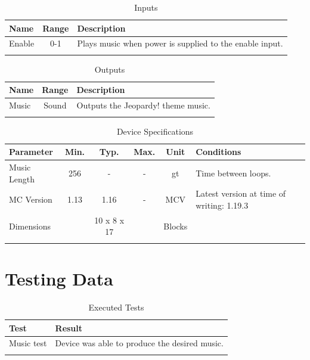 \documentclass[10pt]{datasheet}
\begin{document}
\begin{table}[h]
    \caption{Inputs}
    \begin{tabularx}{\textwidth}{l | c | X}
        \thickhline
        \textbf{Name} & \textbf{Range} & \textbf{Description} \\
        \hline
        Enable & 0-1 & Plays music when power is supplied to the enable input. \\
        \thickhline
\end{tabularx}
\end{table}

\begin{table}[h]
    \caption{Outputs}
    \begin{tabularx}{\textwidth}{l | c | X}
        \thickhline
        \textbf{Name} & \textbf{Range} & \textbf{Description} \\
        \hline
        Music & Sound & Outputs the Jeopardy! theme music. \\
        \thickhline
\end{tabularx}
\end{table}

\begin{table}[h]
    \caption{Device Specifications}
    \begin{tabularx}{\textwidth}{l | c c c | c | X}
        \thickhline
        \textbf{Parameter} & \textbf{Min.} & \textbf{Typ.} & \textbf{Max.} &
        \textbf{Unit} & \textbf{Conditions} \\
        \hline
        Music Length & 256 & - & - & gt & Time between loops. \\
        \hline
        MC Version & 1.13 & 1.16 & - & MCV & Latest version at time of writing: 1.19.3\\
        \hline
        Dimensions & & 10 x 8 x 17 & & Blocks & \\
        \thickhline
\end{tabularx}
\end{table}

\newpage
\section{Testing Data}
\begin{table}[h]
\caption{Executed Tests}
\begin{tabularx}{\textwidth}{l | X}
    \thickhline
    \textbf{Test} & \textbf{Result} \\
    \hline
    Music test & Device was able to produce the desired music. \\
    \thickhline
\end{tabularx}
\end{table}
\end{document}

